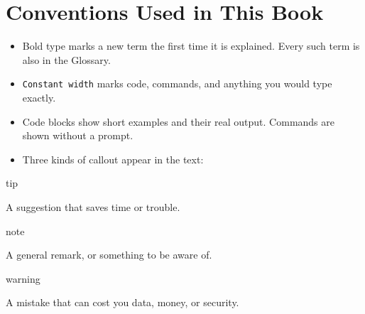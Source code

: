 \section{Conventions Used in This Book}\label{00-preface:conventions-used-in-this-book}

\begin{itemize}
\tightlist
\item
  Bold type marks a new term the first time it is explained. Every such term is also in the Glossary.
\item
  \texttt{Constant\ width} marks code, commands, and anything you would type exactly.
\item
  Code blocks show short examples and their real output. Commands are shown without a prompt.
\item
  Three kinds of callout appear in the text:
\end{itemize}

\begin{callout}{tip}

A suggestion that saves time or trouble.

\end{callout}

\begin{callout}{note}

A general remark, or something to be aware of.

\end{callout}

\begin{callout}{warning}

A mistake that can cost you data, money, or security.

\end{callout}
